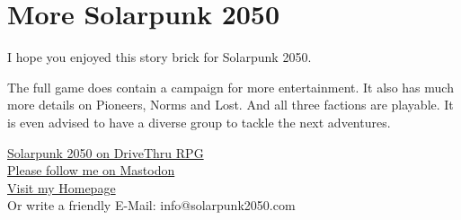 \chapter{More Solarpunk 2050}

I hope you enjoyed this story brick for Solarpunk 2050.

The full game does contain a campaign for more entertainment. It also has much more details on Pioneers, Norms and Lost.
And all three factions are playable. It is even advised to have a diverse group to tackle the next adventures.

\vspace{1cm}
\begin{center}
\href{https://www.drivethrurpg.com/product/443881/Solarpunk-2050?affiliate_id=490747}{Solarpunk 2050 on DriveThru RPG} \\
\href{https://dice.camp/@solarpunk2050}{Please follow me on Mastodon} \\
\href{https://solarpunk2050.com}{Visit my Homepage} \\
Or write a friendly E-Mail: info@solarpunk2050.com \\
\end{center}